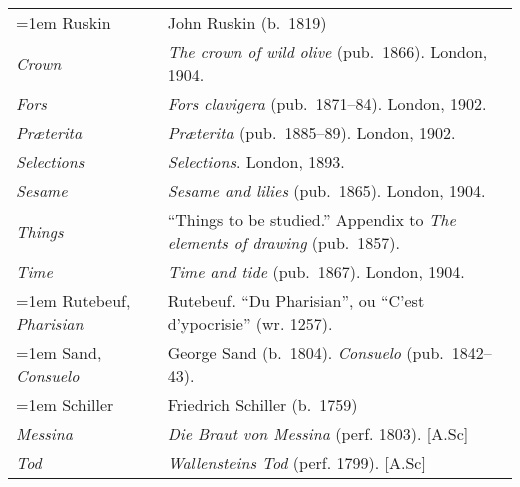 \begin{xltabular}{\textwidth}{ lQ }
\hangindent=1em  Ruskin & John Ruskin (b.~1819) \\
\hspace{1em}\textit{Crown} & \textit{The crown of wild olive} (pub.~1866). London, 1904.  \\
\hspace{1em}\textit{Fors} & \textit{Fors clavigera} (pub.~1871--84). London, 1902.  \\
\hspace{1em}\textit{Præterita} & \textit{Præterita} (pub.~1885--89). London, 1902.  \\
\hspace{1em}\textit{Selections} & \textit{Selections}. London, 1893. \\ %
\hspace{1em}\textit{Sesame} & \textit{Sesame and lilies} (pub.~1865). London, 1904.  \\
\hspace{1em}\textit{Things} & ``Things to be studied.'' Appendix to \textit{The elements of drawing} (pub.~1857). \\
\hspace{1em}\textit{Time} & \textit{Time and tide} (pub.~1867). London, 1904. \\

\hangindent=1em  Rutebeuf, \textit{Pharisian} & Rutebeuf. ``Du Pharisian'', ou ``C'est d'ypocrisie'' (wr. 1257). \\ %

\hangindent=1em  Sand, \textit{Consuelo} & George Sand (b.~1804). \textit{Consuelo} (pub.~1842--43). \\

\hangindent=1em  Schiller & Friedrich Schiller (b.~1759) \\
\hspace{1em}\textit{Messina} & \textit{Die Braut von Messina} (perf. 1803). [A.Sc] \\
\hspace{1em}\textit{Tod} & \textit{Wallensteins Tod} (perf. 1799). [A.Sc] \\


\end{xltabular}
